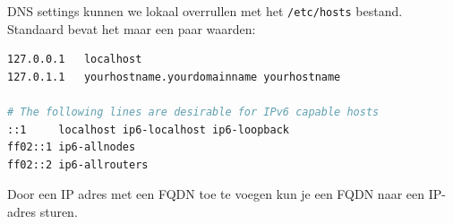DNS settings kunnen we lokaal overrullen met het \texttt{/etc/hosts} bestand. Standaard bevat het maar een paar waarden:
\begin{lstlisting}[language=bash]
127.0.0.1	localhost
127.0.1.1	yourhostname.yourdomainname	yourhostname

# The following lines are desirable for IPv6 capable hosts
::1     localhost ip6-localhost ip6-loopback
ff02::1 ip6-allnodes
ff02::2 ip6-allrouters
\end{lstlisting}
Door een IP adres met een FQDN toe te voegen kun je een FQDN naar een IP-adres sturen.

